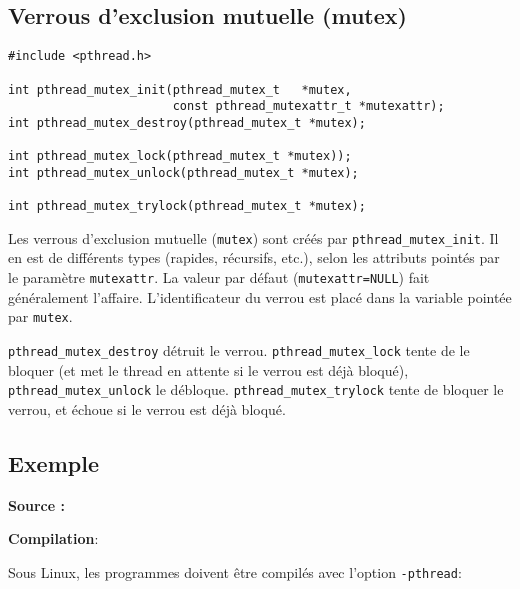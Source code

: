 \subsection{Verrous d'exclusion mutuelle (mutex)}




\extrait
\begin{lstlisting}
#include <pthread.h>

int pthread_mutex_init(pthread_mutex_t   *mutex,   
                       const pthread_mutexattr_t *mutexattr);
int pthread_mutex_destroy(pthread_mutex_t *mutex);

int pthread_mutex_lock(pthread_mutex_t *mutex));
int pthread_mutex_unlock(pthread_mutex_t *mutex);

int pthread_mutex_trylock(pthread_mutex_t *mutex);
\end{lstlisting}


Les verrous d'exclusion mutuelle (\texttt{mutex}) sont  créés
par \texttt{pthread\_mutex\_init}. Il en est de différents types
(rapides, récursifs, etc.), selon les attributs pointés par
le paramètre \texttt{mutexattr}. La valeur par défaut (\texttt{mutexattr=NULL})
fait généralement l'affaire. L'identificateur du verrou est placé
dans la variable pointée par \texttt{mutex}.


\texttt{pthread\_mutex\_destroy} détruit le verrou. 
\texttt{pthread\_mutex\_lock} tente de le bloquer (et met le thread en attente
si le verrou est déjà bloqué), \texttt{pthread\_mutex\_unlock} le débloque.
\texttt{pthread\_mutex\_trylock} tente de bloquer le verrou, et échoue si
le verrou est déjà bloqué.


\subsection{Exemple}

\textbf{Source :}

\source



\textbf{Compilation}:

Sous Linux, les programmes doivent être compilés avec 
l'option  \texttt{-pthread}:

